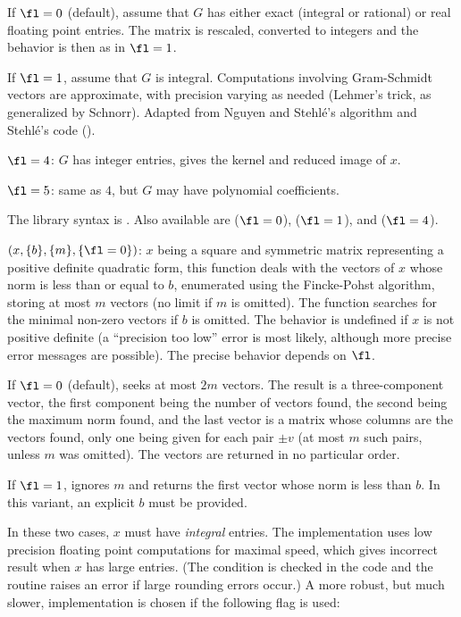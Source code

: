 If $\fl=0$ (default), assume that $G$ has either exact (integral or
rational) or real floating point entries. The matrix is rescaled, converted
to integers and the behavior is then as in $\fl = 1$.

If $\fl=1$, assume that $G$ is integral. Computations involving Gram-Schmidt
vectors are approximate, with precision varying as needed (Lehmer's trick,
as generalized by Schnorr). Adapted from Nguyen and Stehl\'e's algorithm
and Stehl\'e's code ().

$\fl=4$: $G$ has integer entries, gives the kernel and reduced image of $x$.

$\fl=5$: same as $4$, but $G$ may have polynomial coefficients.

The library syntax is .
Also available are  ($\fl=0$),
 ($\fl=1$), and 
($\fl=4$).

$(x,\{b\},\{m\},\{\fl=0\})$: \label{se:qfminim}$x$ being a square and symmetric matrix representing a positive definite
quadratic form, this function deals with the vectors of $x$ whose norm is
less than or equal to $b$, enumerated using the Fincke-Pohst algorithm,
storing at most $m$ vectors (no limit if $m$ is omitted). The function
searches for the minimal non-zero vectors if $b$ is omitted. The behavior is
undefined if $x$ is not positive definite (a ``precision too low'' error is
most likely, although more precise error messages are possible). The precise
behavior depends on $\fl$.

If $\fl=0$ (default), seeks at most $2m$ vectors. The result is a
three-component vector, the first component being the number of vectors
found, the second being the maximum norm found, and the last vector is a
matrix whose columns are the vectors found, only one being given for each
pair $\pm v$ (at most $m$ such pairs, unless $m$ was omitted). The vectors
are returned in no particular order.

If $\fl=1$, ignores $m$ and returns the first vector whose norm is less
than $b$. In this variant, an explicit $b$ must be provided.

In these two cases, $x$ must have \emph{integral} entries. The
implementation uses low precision floating point computations for maximal
speed, which gives incorrect result when $x$ has large entries. (The
condition is checked in the code and the routine raises an error if
large rounding errors occur.) A more robust, but much slower,
implementation is chosen if the following flag is used:

